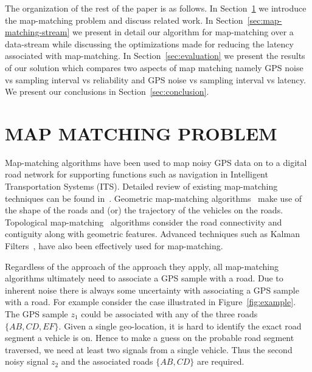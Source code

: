 \documentclass{wscpaperproc}
\theoremstyle{wsc}
\begin{document}
The organization of the rest of the paper is as follows. In Section~\ref{sec:map-matching-intro} we introduce the map-matching problem and discuss related work. In Section~\ref{sec:map-matching-stream} we present in detail our algorithm for map-matching over a data-stream while discussing the optimizations made for reducing the latency associated with map-matching. In Section~\ref{sec:evaluation} we present the results of our solution which compares two aspects of map matching namely GPS noise vs sampling interval vs reliability and GPS noise vs sampling interval vs latency. We present our conclusions in Section~\ref{sec:conclusion}. 


\section{MAP MATCHING PROBLEM}
\label{sec:map-matching-intro}

Map-matching algorithms have been used to map noisy GPS data on to a digital road network for supporting functions such as navigation in Intelligent Transportation Systems (ITS). Detailed review of existing map-matching techniques can be found in~\cite{quddus2007current}. Geometric map-matching algorithms~\cite{jagadeesh2004map} make use of the shape of the roads and (or) the trajectory of the vehicles on the roads. Topological map-matching~\cite{yin2004weight} algorithms consider the road connectivity and contiguity along with geometric features. Advanced techniques such as Kalman Filters~\cite{obradovic2006fusion}, have also been effectively used for map-matching.

Regardless of the approach of the approach they apply, all map-matching algorithms ultimately need to associate a GPS sample with a road. Due to inherent noise there is always some uncertainty with associating a GPS sample with a road. For example consider the case illustrated in Figure~\ref{fig:example}. The GPS sample $z_{1}$ could be associated with any of the three roads $\{AB, CD, EF\}$. Given a single geo-location, it is hard to identify the exact road segment a vehicle is on. Hence to make a guess on the probable road segment traversed, we need at least two signals from a single vehicle. Thus the second noisy signal $z_{2}$ and the associated roads $\{AB, CD\}$ are required.
\end{document}
